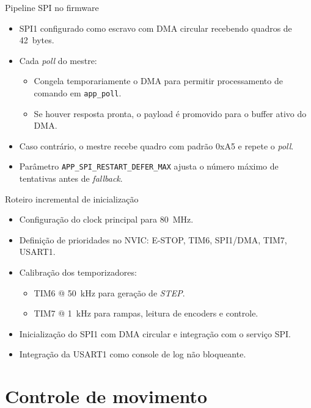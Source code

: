 \documentclass[aspectratio=169]{beamer}
\begin{document}
\begin{frame}{Pipeline SPI no firmware}
  \begin{itemize}
    \item SPI1 configurado como escravo com DMA circular recebendo quadros de 42~bytes.
    \item Cada \emph{poll} do mestre:
      \begin{itemize}
        \item Congela temporariamente o DMA para permitir processamento de comando em \texttt{app\_poll}.
        \item Se houver resposta pronta, o payload é promovido para o buffer ativo do DMA.
      \end{itemize}
    \item Caso contrário, o mestre recebe quadro com padrão 0xA5 e repete o \emph{poll}.
    \item Parâmetro \texttt{APP\_SPI\_RESTART\_DEFER\_MAX} ajusta o número máximo de tentativas antes de \emph{fallback}.
  \end{itemize}
\end{frame}

\begin{frame}{Roteiro incremental de inicialização}
  \begin{itemize}
    \item Configuração do clock principal para \SI{80}{\mega\hertz}.
    \item Definição de prioridades no NVIC: E-STOP, TIM6, SPI1/DMA, TIM7, USART1.
    \item Calibração dos temporizadores:
      \begin{itemize}
        \item TIM6 @ 50~kHz para geração de \emph{STEP}.
        \item TIM7 @ 1~kHz para rampas, leitura de encoders e controle.
      \end{itemize}
    \item Inicialização do SPI1 com DMA circular e integração com o serviço SPI.
    \item Integração da USART1 como console de log não bloqueante.
  \end{itemize}
\end{frame}

\section{Controle de movimento}
\end{document}
